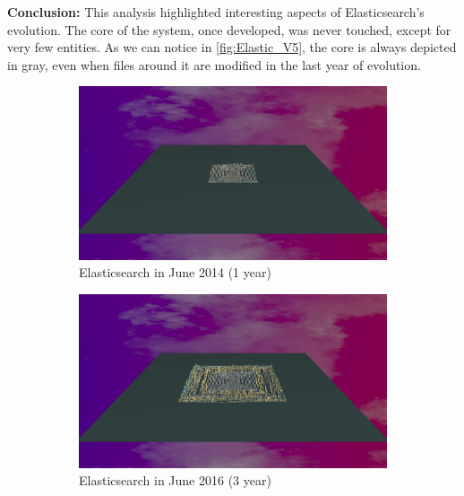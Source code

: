 \bigbreak
\noindent
\textbf{Conclusion:} This analysis highlighted interesting aspects of Elasticsearch's evolution. The core of the system, once developed, was never touched, except for very few entities. As we can notice in  \autoref{fig:Elastic_V5}, the core is always depicted in gray, even when files around it are modified in the last year of evolution. 

\begin{figure}[ht]
    \begin{subfigure}{0.48\textwidth}
        \includegraphics[width=\linewidth]{Elasticsearch/Animation001.png}
        \caption{Elasticsearch in June 2014 (1 year)} 
        \label{fig:Elastic_V5_S1}
    \end{subfigure}\hspace*{\fill}
    \begin{subfigure}{0.48\textwidth}
        \includegraphics[width=\linewidth]{Elasticsearch/Animation003.png}
        \caption{Elasticsearch in June 2016 (3 year)} 
        \label{fig:Elastic_V5_S2}
    \end{subfigure}
    \medskip
    \begin{subfigure}{0.48\textwidth}

\end{subfigure}
\end{figure}
